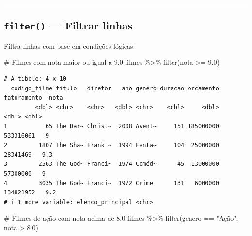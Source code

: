 \documentclass[
  letterpaper,
]{scrbook}
\newenvironment{Shaded}{\begin{snugshade}}{\end{snugshade}}
\newcommand{\CommentTok}[1]{\textcolor[rgb]{0.37,0.37,0.37}{#1}}
\newcommand{\FloatTok}[1]{\textcolor[rgb]{0.68,0.00,0.00}{#1}}
\newcommand{\FunctionTok}[1]{\textcolor[rgb]{0.28,0.35,0.67}{#1}}
\newcommand{\NormalTok}[1]{\textcolor[rgb]{0.00,0.23,0.31}{#1}}
\newcommand{\SpecialCharTok}[1]{\textcolor[rgb]{0.37,0.37,0.37}{#1}}
\newcommand{\StringTok}[1]{\textcolor[rgb]{0.13,0.47,0.30}{#1}}
\begin{document}
\begin{center}\rule{0.5\linewidth}{0.5pt}\end{center}

\subsection{\texorpdfstring{\texttt{filter()} --- Filtrar
linhas}{filter() --- Filtrar linhas}}\label{filter-filtrar-linhas}

Filtra linhas com base em condições lógicas:

\begin{Shaded}
\begin{Highlighting}[]
\CommentTok{\# Filmes com nota maior ou igual a 9.0}
\NormalTok{filmes }\SpecialCharTok{\%\textgreater{}\%} 
  \FunctionTok{filter}\NormalTok{(nota }\SpecialCharTok{\textgreater{}=} \FloatTok{9.0}\NormalTok{)}
\end{Highlighting}
\end{Shaded}

\begin{verbatim}
# A tibble: 4 x 10
  codigo_filme titulo   diretor   ano genero duracao orcamento faturamento  nota
         <dbl> <chr>    <chr>   <dbl> <chr>    <dbl>     <dbl>       <dbl> <dbl>
1           65 The Dar~ Christ~  2008 Avent~     151 185000000   533316061   9  
2         1807 The Sha~ Frank ~  1994 Fanta~     104  25000000    28341469   9.3
3         2563 The God~ Franci~  1974 Coméd~      45  13000000    57300000   9  
4         3035 The God~ Franci~  1972 Crime      131   6000000   134821952   9.2
# i 1 more variable: elenco_principal <chr>
\end{verbatim}

\begin{Shaded}
\begin{Highlighting}[]
\CommentTok{\# Filmes de ação com nota acima de 8.0}
\NormalTok{filmes }\SpecialCharTok{\%\textgreater{}\%} 
  \FunctionTok{filter}\NormalTok{(genero }\SpecialCharTok{==} \StringTok{"Ação"}\NormalTok{, nota }\SpecialCharTok{\textgreater{}} \FloatTok{8.0}\NormalTok{)}
\end{Highlighting}
\end{Shaded}
\end{document}
